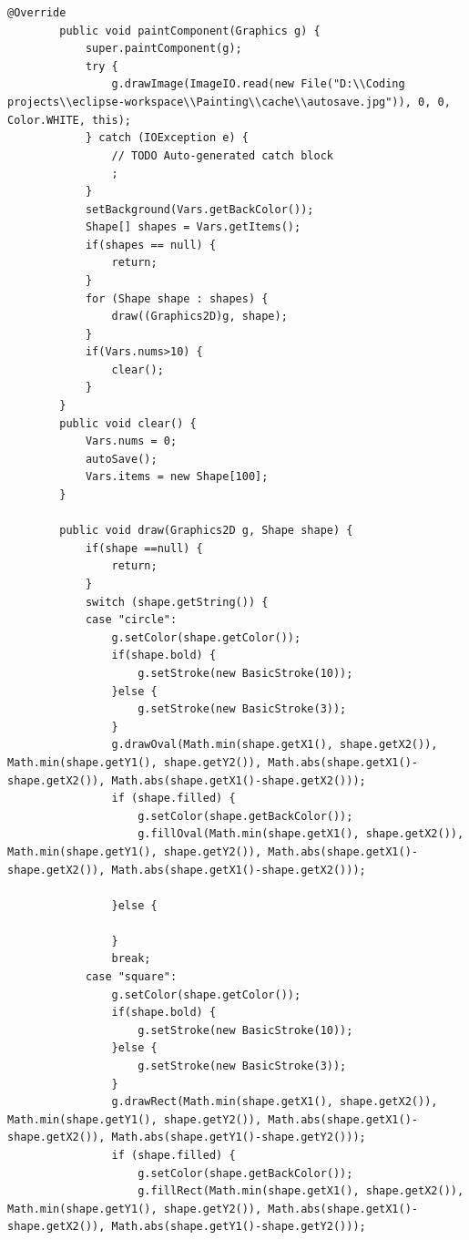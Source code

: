 \documentclass{ctexart}
\begin{document}
\begin{lstlisting}[caption = PaintPanel.java]
        @Override
        public void paintComponent(Graphics g) {
            super.paintComponent(g);
            try {
                g.drawImage(ImageIO.read(new File("D:\\Coding projects\\eclipse-workspace\\Painting\\cache\\autosave.jpg")), 0, 0, Color.WHITE, this);
            } catch (IOException e) {
                // TODO Auto-generated catch block
                ;
            }
            setBackground(Vars.getBackColor());
            Shape[] shapes = Vars.getItems();
            if(shapes == null) {
                return;
            }
            for (Shape shape : shapes) {
                draw((Graphics2D)g, shape);
            }
            if(Vars.nums>10) {
                clear();
            }
        }
        public void clear() {
            Vars.nums = 0;
            autoSave();
            Vars.items = new Shape[100];	
        }
        
        public void draw(Graphics2D g, Shape shape) {
            if(shape ==null) {
                return;
            }
            switch (shape.getString()) {
            case "circle":
                g.setColor(shape.getColor());
                if(shape.bold) {
                    g.setStroke(new BasicStroke(10));
                }else {
                    g.setStroke(new BasicStroke(3));
                }
                g.drawOval(Math.min(shape.getX1(), shape.getX2()), Math.min(shape.getY1(), shape.getY2()), Math.abs(shape.getX1()-shape.getX2()), Math.abs(shape.getX1()-shape.getX2()));
                if (shape.filled) {
                    g.setColor(shape.getBackColor());
                    g.fillOval(Math.min(shape.getX1(), shape.getX2()), Math.min(shape.getY1(), shape.getY2()), Math.abs(shape.getX1()-shape.getX2()), Math.abs(shape.getX1()-shape.getX2()));
    
                }else {
    
                }
                break;
            case "square":
                g.setColor(shape.getColor());
                if(shape.bold) {
                    g.setStroke(new BasicStroke(10));
                }else {
                    g.setStroke(new BasicStroke(3));
                }
                g.drawRect(Math.min(shape.getX1(), shape.getX2()), Math.min(shape.getY1(), shape.getY2()), Math.abs(shape.getX1()-shape.getX2()), Math.abs(shape.getY1()-shape.getY2()));
                if (shape.filled) {
                    g.setColor(shape.getBackColor());
                    g.fillRect(Math.min(shape.getX1(), shape.getX2()), Math.min(shape.getY1(), shape.getY2()), Math.abs(shape.getX1()-shape.getX2()), Math.abs(shape.getY1()-shape.getY2()));
    

\end{lstlisting}
\end{document}
